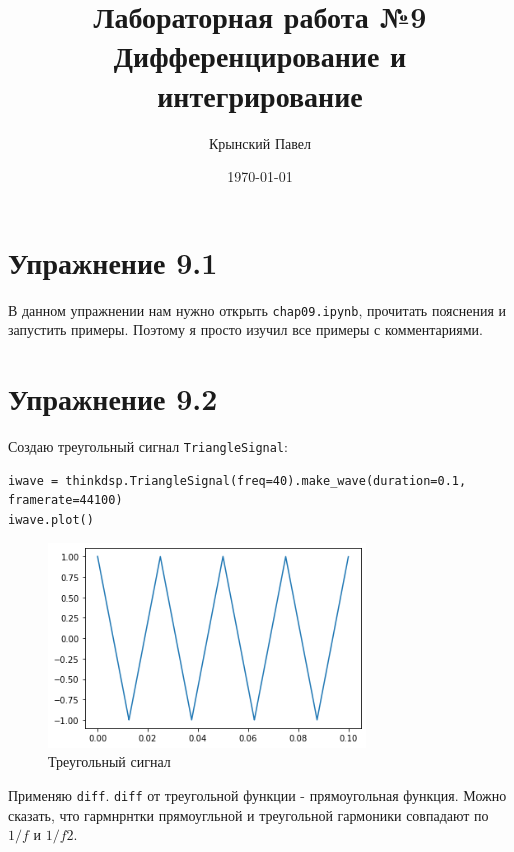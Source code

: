 \documentclass[a4paper,12pt]{report}
\title{Лабораторная работа №9\\Дифференцирование и интегрирование}
\author{Крынский Павел}
\date{\today}
\begin{document}
\maketitle
\tableofcontents
\listoffigures
\lstlistoflistings

\maketitle

\chapter{Упражнение 9.1}

В данном упражнении нам нужно открыть \texttt{chap09.ipynb}, прочитать пояснения и  запустить примеры. Поэтому я просто изучил все примеры с комментариями.
\chapter{Упражнение 9.2}

Создаю треугольный сигнал \texttt{TriangleSignal}:

\begin{lstlisting}[caption=Создание треугольного сигнала]
iwave = thinkdsp.TriangleSignal(freq=40).make_wave(duration=0.1, framerate=44100)
iwave.plot()
\end{lstlisting}

\begin{figure}[H]
        \centering
        \includegraphics[width=0.75\textwidth]{1.png}
        \caption{Треугольный сигнал}
        \label{1}
\end{figure}

Применяю \texttt{diff}. \texttt{diff} от треугольной функции - прямоугольная функция. Можно сказать, что гармнрнтки прямоугльной и треугольной гармоники совпадают по $1/f$ и $1/f2$.
\end{document}
